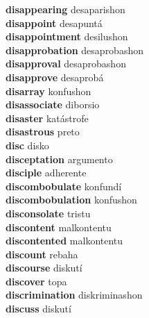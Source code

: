 \textbf{disappearing } desaparishon \\
\textbf{disappoint } desapuntá \\
\textbf{disappointment } desilushon \\
\textbf{disapprobation } desaprobashon \\
\textbf{disapproval } desaprobashon \\
\textbf{disapprove } desaprobá \\
\textbf{disarray } konfushon \\
\textbf{disassociate } diborsio \\
\textbf{disaster } katástrofe \\
\textbf{disastrous } preto \\
\textbf{disc } disko \\
\textbf{disceptation } argumento \\
\textbf{disciple } adherente \\
\textbf{discombobulate } konfundí \\
\textbf{discombobulation } konfushon \\
\textbf{disconsolate } tristu \\
\textbf{discontent } malkontentu \\
\textbf{discontented } malkontentu \\
\textbf{discount } rebaha \\
\textbf{discourse } diskutí \\
\textbf{discover } topa \\
\textbf{discrimination } diskriminashon \\
\textbf{discuss } diskutí \\
